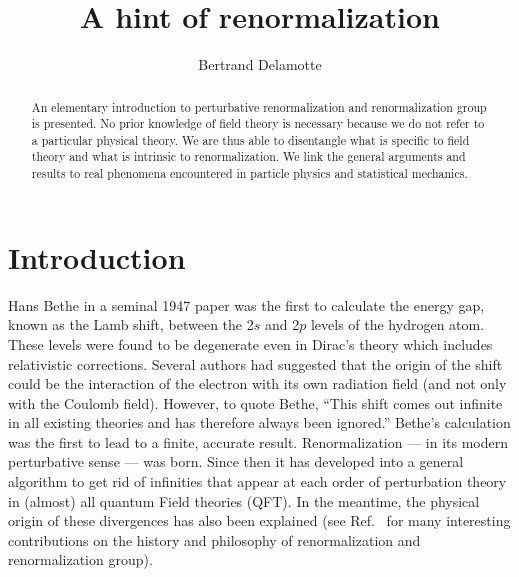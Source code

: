 \documentclass[floatfix,twocolumn,preprintnumbers,amsmath,amssymb,prb]{revtex4}
\begin{document}
\title{A hint of renormalization}
\author{Bertrand Delamotte}

\begin{abstract}
An elementary introduction to perturbative renormalization and
renormalization group is presented. No prior knowledge of field
theory is necessary because we do not refer to a particular
physical theory. We are thus able to
disentangle what is specific to field theory and what is intrinsic
to renormalization. We link the general arguments and results to
real phenomena encountered in particle physics and statistical
mechanics.
\end{abstract}

\maketitle

\section{Introduction}
Hans Bethe in a seminal 1947 paper was
the first to calculate the energy gap, known as the Lamb shift, 
between the 2$s$ and 2$p$ levels of the hydrogen
atom.\cite{bethe47} These levels were found to be degenerate even
in Dirac's theory which includes relativistic corrections. Several
authors had suggested that the origin of the shift could be the
interaction of the electron with its own radiation field (and not
only with the Coulomb field). However, to quote Bethe, ``This
shift comes out infinite in all existing theories and has
therefore always been ignored.'' Bethe's calculation was the first
to lead to a finite, accurate result. Renormalization --- in its
modern perturbative sense --- was born.\cite{weinberg95} Since
then it has developed into a general algorithm to get rid of
infinities that appear at each order of perturbation theory in
(almost) all quantum Field theories
(QFT).\cite{collins84,ryder85,lebellac91,binney92,goldenfeld92} In
the meantime, the physical origin of these divergences has also
been explained (see Ref.~ for many interesting
contributions on the history and philosophy of renormalization
and renormalization group). 
\end{document}
